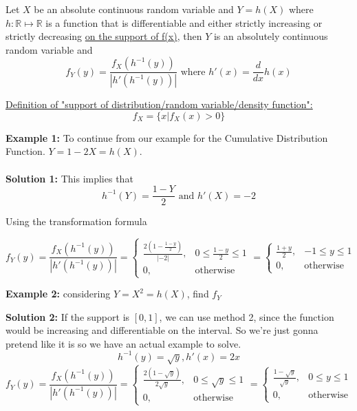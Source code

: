 \documentclass[12pt, twoside]{article}
\begin{document}
\begin{tcolorbox}[title=Theorem: Transformation Formula]
	Let $X$ be an absolute continuous random variable and $Y = h(X)$ where $h:\mathbb{R}\mapsto \mathbb{R}$ is a function that is differentiable and either strictly increasing or strictly decreasing \underline{on the support of f(x)}, then $Y$ is an absolutely continuous random variable and
	$$f_Y (y) = \frac{f_X (h^{-1} (y))}{|h'(h^{-1} (y))|} \text{ where } h'(x) = \frac{d}{dx} h(x)$$
\end{tcolorbox}

\underline{Definition of "support of distribution/random variable/density function":}$$f_X = \{ x | f_X (x) > 0 \}$$

\textbf{Example 1:} To continue from our example for the Cumulative Distribution Function. $Y = 1 - 2X = h(X)$.\\
\\
\textbf{Solution 1:} This implies that
$$h^{-1} (Y) = \frac{1-Y}{2} \text{ and } h'(X) = -2$$

Using the transformation formula

$$f_Y (y) = \frac{f_X (h^{-1} (y))}{|h'(h^{-1} (y))|} = 
\begin{cases}
	\frac{2(1- \frac{1-y}{2})}{|-2|}, & 0 \leq \frac{1-y}{2} \leq 1\\
	0, & \text{otherwise}
\end{cases}
= \begin{cases}
	\frac{1+y}{2}, & -1 \leq y \leq 1\\
	0, & \text{otherwise}
\end{cases}
$$

\textbf{Example 2:} considering $Y = X^2 = h(X)$, find $f_Y$

\textbf{Solution 2:} If the support is $[0,1]$, we can use method 2, since the function would be increasing and differentiable on the interval. So we're just gonna pretend like it is so we have an actual example to solve.
$$h^{-1} (y) = \sqrt{y}, h'(x) = 2x$$
$$f_Y (y) = \frac{f_X (h^{-1} (y))}{|h'(h^{-1} (y))|} =  
\begin{cases}
	\frac{2(1- \sqrt{y})}{2\sqrt{y}}, & 0 \leq \sqrt{y} \leq 1\\
	0, & \text{otherwise}
\end{cases} = 
\begin{cases}
	\frac{1 - \sqrt{y}}{\sqrt{y}}, & 0 \leq y \leq 1\\
	0, & \text{otherwise}
\end{cases}$$
\end{document}
